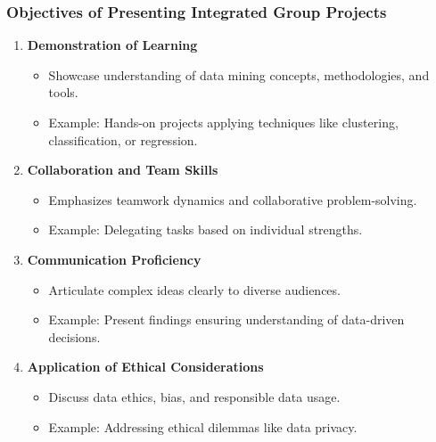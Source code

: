 \documentclass[aspectratio=169]{beamer}
\begin{document}
\begin{frame}[fragile]
    \frametitle{Objectives of Presenting Integrated Group Projects}
    \begin{enumerate}
        \item \textbf{Demonstration of Learning}
        \begin{itemize}
            \item Showcase understanding of data mining concepts, methodologies, and tools.
            \item Example: Hands-on projects applying techniques like clustering, classification, or regression.
        \end{itemize}

        \item \textbf{Collaboration and Team Skills}
        \begin{itemize}
            \item Emphasizes teamwork dynamics and collaborative problem-solving.
            \item Example: Delegating tasks based on individual strengths.
        \end{itemize}

        \item \textbf{Communication Proficiency}
        \begin{itemize}
            \item Articulate complex ideas clearly to diverse audiences.
            \item Example: Present findings ensuring understanding of data-driven decisions.
        \end{itemize}

        \item \textbf{Application of Ethical Considerations}
        \begin{itemize}
            \item Discuss data ethics, bias, and responsible data usage.
            \item Example: Addressing ethical dilemmas like data privacy.
        \end{itemize}
    \end{enumerate}
\end{frame}
\end{document}
